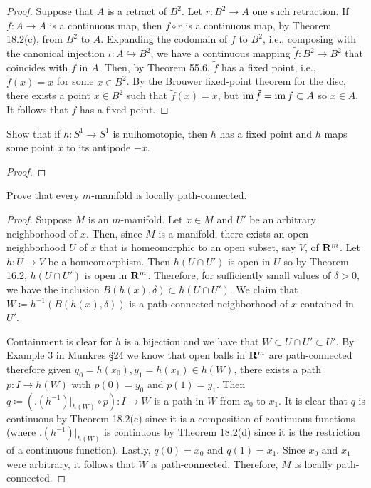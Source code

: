 \begin{proof}
Suppose that $A$ is a retract of $B^2$. Let $r\colon B^2\to A$ one such
retraction. If $f\colon A\to A$ is a continuous map, then $f\circ r$ is a
continuous map, by Theorem 18.2(c), from $B^2$ to $A$. Expanding the
codomain of $f$ to $B^2$, i.e., composing with the canonical injection
$\iota\colon A\hookrightarrow B^2$, we have a continuous mapping
$\tilde{f}\colon B^2\to B^2$ that coincides with $f$ in $A$. Then, by
Theorem 55.6, $\tilde f$ has a fixed point, i.e., $\tilde{f}(x)=x$ for some
$x\in B^2$. By the Brouwer fixed-point theorem for the disc, there exists a
point $x\in B^2$ such that $\tilde{f}(x)=x$, but $\operatorname{im}{\tilde{f}}=\operatorname{im}
f\subset A$ so $x\in A$. It follows that $f$ has a fixed point.
\end{proof}
\newpage
\begin{problem}[Munkres \S55, Ex.\,2]
Show that if $h\colon S^1\to S^1$ is nulhomotopic, then $h$ has a
fixed point and $h$ maps some point $x$ to its antipode $-x$.
\end{problem}
\begin{proof}
\end{proof}
\newpage
\begin{problem}[(A)]
Prove that every $m$-manifold is locally path-connected.
\end{problem}
\begin{proof}
Suppose $M$ is an $m$-manifold. Let $x\in M$ and $U'$ be an arbitrary
neighborhood of $x$. Then, since $M$ is a manifold, there exists an open
neighborhood $U$ of $x$ that is homeomorphic to an open subset, say $V$, of
$\mathbf{R}^m$. Let $h\colon U\to V$ be a homeomorphism. Then $h(U\cap U')$ is
open in $U$ so by Theorem 16.2, $h(U\cap U')$ is open in
$\mathbf{R}^m$. Therefore, for sufficiently small values of $\delta>0$, we have
the inclusion $B(h(x),\delta)\subset h(U\cap U')$. We claim that
$W\coloneqq h^{-1}(B(h(x),\delta))$ is a path-connected neighborhood of $x$
contained in $U'$.

Containment is clear for $h$ is a bijection and we have that $W\subset
U\cap U'\subset U'$. By Example 3 in Munkres \S24 we know that open balls
in $\mathbf{R}^m$ are path-connected therefore given $y_0=h(x_0),y_1=h(x_1)\in
h(W)$, there exists a path $p\colon I\to h(W)$ with $p(0)=y_0$ and
$p(1)=y_1$. Then $q\coloneqq \left(\bigl.(h^{-1})\bigr|_{h(W)}\circ
  p\right)\colon I\to W$ is a path in $W$ from $x_0$ to $x_1$. It is clear
that $q$ is continuous by Theorem 18.2(c) since it is a composition of
continuous functions (where $\bigl.(h^{-1})\bigr|_{h(W)}$ is continuous by
Theorem 18.2(d) since it is the restriction of a continuous
function). Lastly, $q(0)=x_0$ and $q(1)=x_1$. Since $x_0$ and $x_1$ were
arbitrary, it follows that $W$ is path-connected. Therefore, $M$ is locally
path-connected.
\end{proof}
